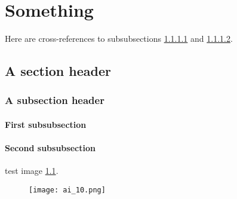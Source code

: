 \documentclass{report}
\begin{document}
\chapter{Something}

Here are cross-references to subsubsections \ref{sssec:num1} and \ref{sssec:num2}.

\section{A section header}
\subsection{A subsection header}
\subsubsection{First subsubsection} \label{sssec:num1}
\subsubsection{Second subsubsection} \label{sssec:num2}

test image \ref{fig:test}.

\begin{figure}[h]
	\centering
	\texttt{[image: ai\_10.png]}
	\label{fig:test}
\end{figure}
\end{document}
